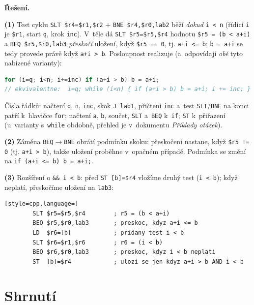 \documentclass[11pt,a4paper]{article}
\newcommand{\cd}{\lstinline[style=cpp]}
\begin{document}
\begin{priklad}
\medskip
\textbf{Řešení.}\par
\textbf{(1)} Test cyklu \texttt{SLT \$r4=\$r1,\$r2} + \texttt{BNE \$r4,\$r0,lab2}
běží \emph{dokud} \texttt{i < n} (řídicí \texttt{i} je \texttt{\$r1}, start
\texttt{q}, krok \texttt{inc}). V~těle dá \texttt{SLT \$r5=\$r5,\$r4} hodnotu
\texttt{\$r5 = (b < a+i)} a \texttt{BEQ \$r5,\$r0,lab3} \emph{přeskočí} uložení,
když \texttt{\$r5 == 0}, tj. \texttt{a+i <= b}; \texttt{b = a+i} se tedy provede
právě když \texttt{a+i > b}. Posloupnost realizuje (a~odpovídají \emph{obě} tyto
nabízené varianty):
\begin{lstlisting}[style=cpp,language=C]
for (i=q; i<n; i+=inc) if (a+i > b) b = a+i;
// ekvivalentne:  i=q; while (i<n) { if (a+i > b) b = a+i; i += inc; }
\end{lstlisting}
Čísla řádků: načtení \texttt{q}, \texttt{n}, \texttt{inc}, skok \texttt{J lab1}, přičtení \texttt{inc} a~test \texttt{SLT}/\texttt{BNE} na konci patří k~hlavičce \texttt{for}; načtení \texttt{a}, \texttt{b}, součet, \texttt{SLT} a~\texttt{BEQ} k~\texttt{if}; \texttt{ST} k~přiřazení (u~varianty s~\texttt{while} obdobně, přehled je v~dokumentu \emph{Příklady otázek}).

\textbf{(2)} Záměna \texttt{BEQ}$\to$\texttt{BNE} obrátí podmínku skoku: přeskočení
nastane, když \texttt{\$r5 != 0} (tj. \texttt{a+i > b}), takže uložení proběhne
v~opačném případě. Podmínka se změní na \cd{if (a+i <= b) b = a+i;}.

\textbf{(3)} Rozšíření o \texttt{\&\& i < b}: před \texttt{ST [b]=\$r4} vložíme
druhý test (\texttt{i < b}); když neplatí, přeskočíme uložení na \texttt{lab3}:
\begin{lstlisting}[style=cpp,language=]
        SLT $r5=$r5,$r4        ; r5 = (b < a+i)
        BEQ $r5,$r0,lab3       ; preskoc, kdyz a+i <= b
        LD  $r6=[b]            ; pridany test i < b
        SLT $r6=$r1,$r6        ; r6 = (i < b)
        BEQ $r6,$r0,lab3       ; preskoc, kdyz i < b neplati
        ST  [b]=$r4            ; ulozi se jen kdyz a+i > b AND i < b
\end{lstlisting}
\end{priklad}

\section*{Shrnutí}
\end{document}
